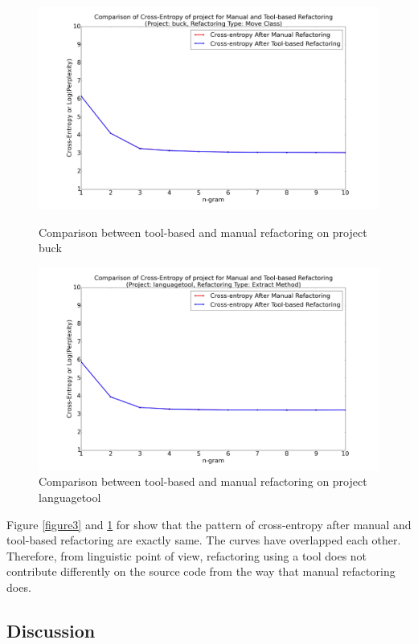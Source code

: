 \documentclass[conference]{IEEEtran}
\begin{document}
\begin{figure}[ht!]
\centering
\includegraphics[width=150mm]{../Result/Refactoring_MoveClass/Plot/ManualVsTool_buck.png}
\caption{Comparison between tool-based and manual refactoring on project buck}
\label{figure3}
\includegraphics[width=150mm]{../Result/Refactoring_ExtractMethod/Plots/ToolVsManual_languagetool.png}
\caption{Comparison between tool-based and manual refactoring on project languagetool}
\label{figure4}
\end{figure}

Figure \ref{figure3} and \ref{figure4} for show that the pattern of cross-entropy after manual and tool-based refactoring are exactly same. The curves have overlapped each other. Therefore, from linguistic point of view, refactoring using a tool does not contribute differently on the source code from the way that manual refactoring does.

\subsection{Discussion}
\end{document}
